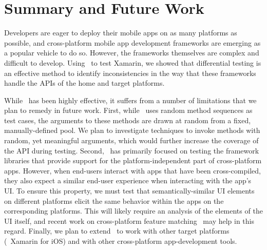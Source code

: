 \section{Summary and Future Work}
\label{section:conclusions}

Developers are eager to deploy their mobile apps on as many platforms as
possible, and cross-platform mobile app development frameworks are emerging as
a popular vehicle to do so. However, the frameworks themselves are complex and
difficult to develop. Using \tool\ to test Xamarin, we showed that differential
testing is an effective method to identify inconsistencies in the way that
these frameworks handle the APIs of the home and target platforms.

While \tool\ has been highly effective, it suffers from a number of limitations
that we plan to remedy in future work. First, while \tool\ uses random method
sequences as test cases, the arguments to these methods are drawn at random
from a fixed, manually-defined pool. We plan to investigate techniques to
invoke methods with random, yet meaningful arguments, which would further
increase the coverage of the API during testing. Second, \tool\ has primarily
focused on testing the framework libraries that provide support for the
platform-independent part of cross-platform apps. However, when end-users
interact with apps that have been cross-compiled, they also expect a similar
end-user experience when interacting with the app's UI. To ensure this
property, we must test that semantically-similar UI elements on different
platforms elicit the same behavior within the apps on the corresponding
platforms. This will likely require an analysis of the elements of the UI
itself, and recent work on cross-platform feature matching~\cite{fmap:issta14}
may help in this regard. Finally, we plan to extend \tool\ to work with other
target platforms (\eg~Xamarin for iOS) and with other cross-platform
app-development tools.

